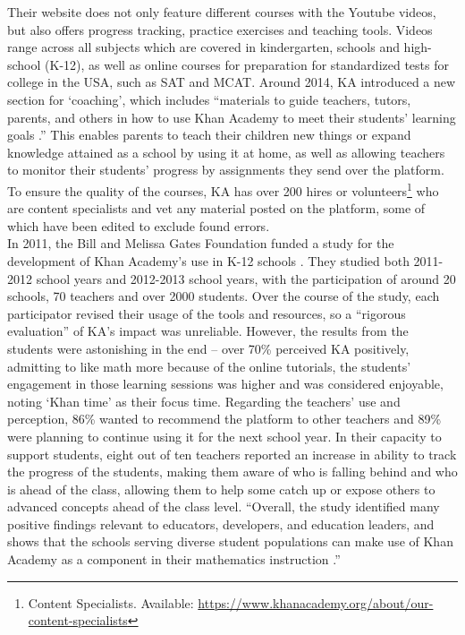 \documentclass[a4paper]{article}
\begin{document}
\noindent
Their website does not only feature different courses with the Youtube videos, but also offers progress tracking, practice exercises and teaching tools. Videos range across all subjects which are covered in kindergarten, schools and high-school (K-12), as well as online courses for preparation for standardized tests for college in the USA, such as SAT and MCAT. Around 2014, KA introduced a new section for `coaching', which includes ``materials to guide teachers, tutors, parents, and others in how to use Khan Academy to meet their students’ learning goals \cite[p.3]{khan-ac}.'' This enables parents to teach their children new things or expand knowledge attained as a school by using it at home, as well as allowing teachers to monitor their students' progress by assignments they send over the platform. To ensure the quality of the courses, KA has over 200 hires or volunteers\footnote{Content Specialists. Available: \url{https://www.khanacademy.org/about/our-content-specialists}} who are content specialists and vet any material posted on the platform, some of which have been edited to exclude found errors. \\

\noindent
In 2011, the Bill and Melissa Gates Foundation funded a study for the development of Khan Academy's use in K-12 schools \cite{khan-ac}. They studied both 2011-2012 school years and 2012-2013 school years, with the participation of around 20 schools, 70 teachers and over 2000 students. Over the course of the study, each participator revised their usage of the tools and resources, so a ``rigorous evaluation'' of KA's impact was unreliable. However, the results from the students were astonishing in the end -- over 70\% perceived KA positively, admitting to like math more because of the online tutorials, the students' engagement in those learning sessions was higher and was considered enjoyable, noting `Khan time' as their focus time. Regarding the teachers' use and perception, 86\% wanted to recommend the platform to other teachers and 89\% were planning to continue using it for the next school year. In their capacity to support students, eight out of ten teachers reported an increase in ability to track the progress of the students, making them aware of who is falling behind and who is ahead of the class, allowing them to help some catch up or expose others to advanced concepts ahead of the class level. ``Overall, the study identified many positive findings relevant to educators, developers, and education leaders, and shows that the schools serving diverse student populations can make use of Khan Academy as a component in their mathematics instruction \cite[p.15]{khan-ac}.''
\end{document}
